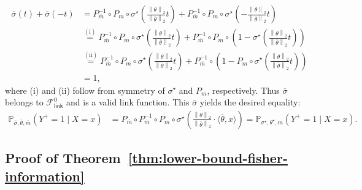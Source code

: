 \documentclass[11pt]{article}
\newcommand{\Prb}{\mathbb{P}}
\newcommand{\norm}[1]{\left\|{#1}\right\|} %
\newcommand{\wb}[1]{\overline{#1}}
\newcommand{\majY}{Y^+}
\newcommand{\fsymlink}{\mathcal{F}_{\mathsf{link}}^0}
\newcommand{\ltwo}[1]{\norm{#1}_2} %
\newcommand{\<}{\langle} %
\renewcommand{\>}{\rangle}
\newcommand{\opt}{^\star}
\begin{document}
\begin{align*}
	\wb{\sigma}(t) + \wb{\sigma}(-t) & = P_{\wb{m}}^{-1} \circ P_{m} \circ \sigma\opt \left(\frac{\ltwo{\theta}}{\ltwo{\wb{\theta}}} t \right) + P_{\wb{m}}^{-1} \circ P_{m} \circ \sigma\opt \left(-\frac{\ltwo{\theta}}{\ltwo{\wb{\theta}}} t \right) \nonumber \\
	& \stackrel{\mathrm{(i)}}{=} P_{\wb{m}}^{-1} \circ P_{m} \circ \sigma\opt \left(\frac{\ltwo{\theta}}{\ltwo{\wb{\theta}}} t \right) + P_{\wb{m}}^{-1} \circ P_{m} \circ \left(1 - \sigma\opt \left(\frac{\ltwo{\theta}}{\ltwo{\wb{\theta}}} t \right) \right) \nonumber \\
	& \stackrel{\mathrm{(ii)}}{=} P_{\wb{m}}^{-1} \circ P_{m} \circ \sigma\opt \left(\frac{\ltwo{\theta}}{\ltwo{\wb{\theta}}} t \right) + P_{\wb{m}}^{-1} \circ \left(1 -  P_m \circ \sigma\opt \left(\frac{\ltwo{\theta}}{\ltwo{\wb{\theta}}} t \right)\right) \nonumber \\
	& = 1   ,
\end{align*}
where (i) and (ii) follow from symmetry of $\sigma\opt$ and $P_m$, respectively. Thus $\wb{\sigma}$ belongs to $\fsymlink$ and is a valid link function. This $\bar{\sigma}$ yields the desired equality:
\begin{align*}
	\Prb_{\wb{\sigma}, \wb{\theta}, \wb{m}}(\majY = 1 \mid X=x) &   = P_{\wb{m}} \circ P_{\wb{m}}^{-1} \circ P_{m} \circ \sigma\opt \left(\frac{\ltwo{\theta}}{\ltwo{\wb{\theta}}} \cdot \< \wb{\theta}, x \> \right)  = \Prb_{\sigma\opt, \theta\opt, m} (\majY = 1 \mid X=x).
\end{align*}


\subsection{Proof of Theorem~\ref{thm:lower-bound-fisher-information}} \label{proof:lower-bound-fisher-information}
\end{document}
